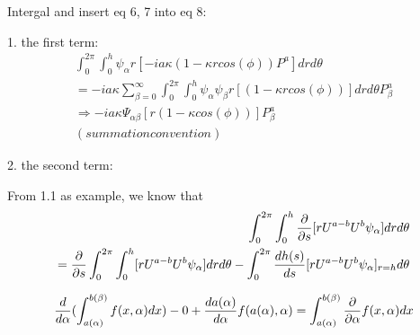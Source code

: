 \documentclass{Note}
\begin{document}
Intergal and insert eq 6, 7 into eq 8:

1. the first term:
\begin{equation}
\begin{aligned}
\int_0^{2\pi}\int_0^h \psi_\alpha r [-ia\kappa (1-\kappa r cos(\phi))P^a] dr d\theta\\
=-ia\kappa \sum_{\beta=0}^\infty \int_0^{2\pi}\int_0^h \psi_\alpha\psi_\beta r [(1-\kappa r cos(\phi))] dr d\theta P_\beta^a\\
\Rightarrow -ia \kappa \Psi_{\alpha\beta}[r(1-\kappa cos(\phi))] P_\beta^a \\
(summation convention)
\end{aligned}
\end{equation}

2. the second term:

From 1.1 as example, we know that
\begin{equation}
\begin{aligned}
\int_0^{2\pi}\int_0^h   {{\partial }\over {\partial s}}[ {r U^{a-b}} U^b\psi_\alpha] dr d\theta \\
={{\partial }\over {\partial s}}\int_0^{2\pi}\int_0^h   [ {r U^{a-b}} U^b\psi_\alpha] dr d\theta 
-\int_0^{2\pi}{dh(s)\over ds}[ {r U^{a-b}} U^b\psi_\alpha]_{r=h}d\theta\\
\end{aligned}
\end{equation}

\begin{equation}
\begin{aligned}
{d\over d\alpha}(\int_{a(\alpha)}^{b(\beta)}f(x,\alpha)dx)-0+{da(\alpha)\over d\alpha}f(a(\alpha),\alpha)=\int_{a(\alpha)}^{b(\beta)}{\partial \over \partial \alpha}f(x,\alpha)dx
\end{aligned}
\end{equation}
\end{document}
